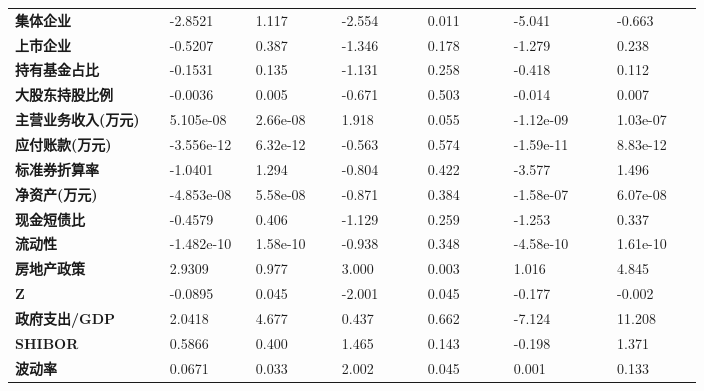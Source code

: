 \begin{center}
\begin{longtable}{p{0.18\linewidth}p{0.1\linewidth}p{0.1\linewidth}p{0.1\linewidth}p{0.1\linewidth}p{0.12\linewidth}p{0.1\linewidth}}
		\textbf{集体企业}           & -2.8521       & 1.117            & -2.554     & 0.011          & -5.041          & -0.663          \\
		\textbf{上市企业}           & -0.5207       & 0.387            & -1.346     & 0.178          & -1.279          & 0.238           \\
		\textbf{持有基金占比}       & -0.1531       & 0.135            & -1.131     & 0.258          & -0.418          & 0.112           \\
		\textbf{大股东持股比例}     & -0.0036       & 0.005            & -0.671     & 0.503          & -0.014          & 0.007           \\
		\textbf{主营业务收入(万元)} & 5.105e-08     & 2.66e-08         & 1.918      & 0.055          & -1.12e-09       & 1.03e-07        \\
		\textbf{应付账款(万元)}     & -3.556e-12    & 6.32e-12         & -0.563     & 0.574          & -1.59e-11       & 8.83e-12        \\
		\textbf{标准券折算率}       & -1.0401       & 1.294            & -0.804     & 0.422          & -3.577          & 1.496           \\
		\textbf{净资产(万元)}       & -4.853e-08    & 5.58e-08         & -0.871     & 0.384          & -1.58e-07       & 6.07e-08        \\
		\textbf{现金短债比}         & -0.4579       & 0.406            & -1.129     & 0.259          & -1.253          & 0.337           \\
		\textbf{流动性}             & -1.482e-10    & 1.58e-10         & -0.938     & 0.348          & -4.58e-10       & 1.61e-10        \\
		\textbf{房地产政策}         & 2.9309        & 0.977            & 3.000      & 0.003          & 1.016           & 4.845           \\
		\textbf{Z}                  & -0.0895       & 0.045            & -2.001     & 0.045          & -0.177          & -0.002          \\
		\textbf{政府支出/GDP}       & 2.0418        & 4.677            & 0.437      & 0.662          & -7.124          & 11.208          \\
		\textbf{SHIBOR}             & 0.5866        & 0.400            & 1.465      & 0.143          & -0.198          & 1.371           \\
		\textbf{波动率}             & 0.0671        & 0.033            & 2.002      & 0.045          & 0.001           & 0.133           \\
		\bottomrule
	\end{longtable}

\end{center}
